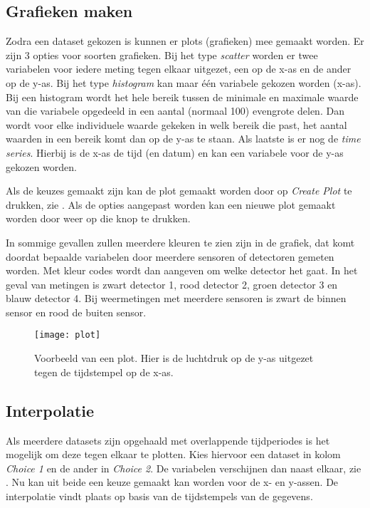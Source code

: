 \subsection{Grafieken maken}\label{subsec:plotting}

Zodra een dataset gekozen is kunnen er plots (grafieken) mee gemaakt
worden. Er zijn 3 opties voor soorten grafieken. Bij het type
\emph{scatter} worden er twee variabelen voor iedere meting tegen elkaar
uitgezet, een op de x-as en de ander op de y-as. Bij het type
\emph{histogram} kan maar één variabele gekozen worden (x-as). Bij een
histogram wordt het hele bereik tussen de minimale en maximale waarde
van die variabele opgedeeld in een aantal (normaal 100) evengrote delen.
Dan wordt voor elke individuele waarde gekeken in welk bereik die past,
het aantal waarden in een bereik komt dan op de y-as te staan. Als
laatste is er nog de \emph{time series}. Hierbij is de x-as de tijd (en
datum) en kan een variabele voor de y-as gekozen worden.

Als de keuzes gemaakt zijn kan de plot gemaakt worden door op
\emph{Create Plot} te drukken, zie . Als de opties
aangepast worden kan een nieuwe plot gemaakt worden door weer op die
knop te drukken.

In sommige gevallen zullen meerdere kleuren te zien zijn in de grafiek,
dat komt doordat bepaalde variabelen door meerdere sensoren of
detectoren gemeten worden. Met kleur codes wordt dan aangeven om welke
detector het gaat. In het geval van \hisparc metingen is zwart detector
1, rood detector 2, groen detector 3 en blauw detector 4. Bij
weermetingen met meerdere sensoren is zwart de binnen sensor en rood de
buiten sensor.

\begin{figure}
    \centering
    \texttt{[image: plot]}
    \caption{Voorbeeld van een plot. Hier is de luchtdruk op de y-as
             uitgezet tegen de tijdstempel op de x-as.}
    \label{fig:plot}
\end{figure}


\subsection{Interpolatie}

Als meerdere datasets zijn opgehaald met overlappende tijdperiodes is
het mogelijk om deze tegen elkaar te plotten. Kies hiervoor een dataset
in kolom \emph{Choice 1} en de ander in \emph{Choice 2}. De variabelen
verschijnen dan naast elkaar, zie . Nu kan uit
beide een keuze gemaakt kan worden voor de x- en y-assen. De
interpolatie vindt plaats op basis van de tijdstempels van de gegevens.

